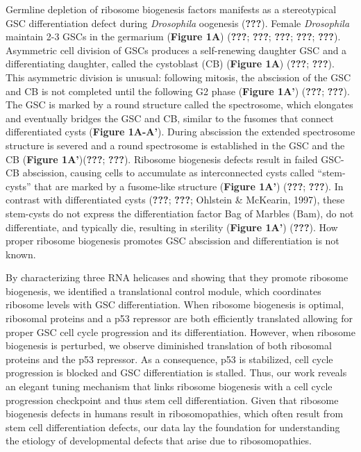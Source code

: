 \documentclass[12pt,oneside]{reedthesis}
\begin{document}
Germline depletion of ribosome biogenesis factors manifests as a stereotypical GSC differentiation defect during \emph{Drosophila} oogenesis ({\textbf{???}}). Female \emph{Drosophila} maintain 2-3 GSCs in the germarium (\textbf{Figure 1A}) ({\textbf{???}}; {\textbf{???}}; {\textbf{???}}; {\textbf{???}}; {\textbf{???}}). Asymmetric cell division of GSCs produces a self-renewing daughter GSC and a differentiating daughter, called the cystoblast (CB) (\textbf{Figure 1A}) ({\textbf{???}}; {\textbf{???}}). This asymmetric division is unusual: following mitosis, the abscission of the GSC and CB is not completed until the following G2 phase (\textbf{Figure 1A'}) ({\textbf{???}}; {\textbf{???}}). The GSC is marked by a round structure called the spectrosome, which elongates and eventually bridges the GSC and CB, similar to the fusomes that connect differentiated cysts (\textbf{Figure 1A-A'}). During abscission the extended spectrosome structure is severed and a round spectrosome is established in the GSC and the CB (\textbf{Figure 1A'})({\textbf{???}}; {\textbf{???}}). Ribosome biogenesis defects result in failed GSC-CB abscission, causing cells to accumulate as interconnected cysts called ``stem-cysts'' that are marked by a fusome-like structure (\textbf{Figure 1A'}) ({\textbf{???}}; {\textbf{???}}). In contrast with differentiated cysts ({\textbf{???}}; {\textbf{???}}; Ohlstein \& McKearin, 1997), these stem-cysts do not express the differentiation factor Bag of Marbles (Bam), do not differentiate, and typically die, resulting in sterility (\textbf{Figure 1A'}) ({\textbf{???}}). How proper ribosome biogenesis promotes GSC abscission and differentiation is not known.

By characterizing three RNA helicases and showing that they promote ribosome biogenesis, we identified a translational control module, which coordinates ribosome levels with GSC differentiation. When ribosome biogenesis is optimal, ribosomal proteins and a p53 repressor are both efficiently translated allowing for proper GSC cell cycle progression and its differentiation. However, when ribosome biogenesis is perturbed, we observe diminished translation of both ribosomal proteins and the p53 repressor. As a consequence, p53 is stabilized, cell cycle progression is blocked and GSC differentiation is stalled. Thus, our work reveals an elegant tuning mechanism that links ribosome biogenesis with a cell cycle progression checkpoint and thus stem cell differentiation. Given that ribosome biogenesis defects in humans result in ribosomopathies, which often result from stem cell differentiation defects, our data lay the foundation for understanding the etiology of developmental defects that arise due to ribosomopathies.
\end{document}
